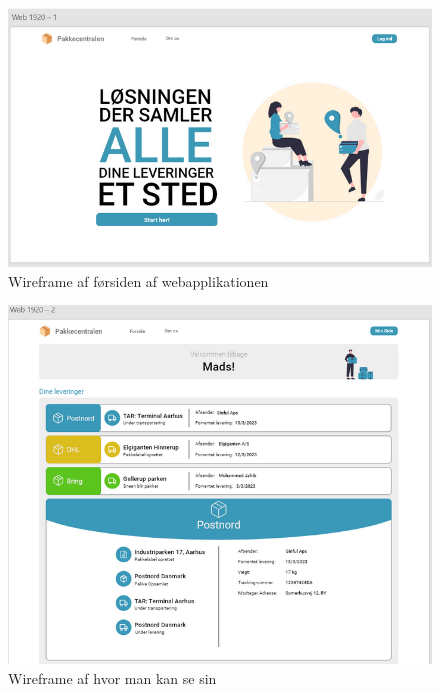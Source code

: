 \begin{figure}[!htbp]
    \includegraphics[width=0.7\linewidth]{Pictures/Wireframe1.png}
    \caption{Wireframe af førsiden af webapplikationen}
     \label{fig:Wireframe1}
  \end{figure}


  \begin{figure}[!h]
    \centering
    \includegraphics[width=0.7\linewidth]{Pictures/Wireframe2.png}
    \caption{Wireframe af hvor man kan se sin}
     \label{fig:Wireframe2}
  \end{figure}
